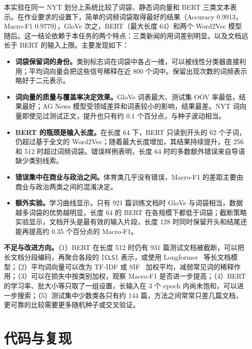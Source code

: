 \documentclass[lang=cn,a4paper]{elegantpaper}
\begin{document}
本实验在同一 NYT 划分上系统比较了词袋、静态词向量和 BERT 三类文本表示。在作业要求的设置下，简单的词频词袋取得最好的结果（Accuracy 0.9913，Macro-F1 0.9779），GloVe 次之，BERT（最大长度 64）和两个 Word2Vec 模型随后。这一结论依赖于本任务的两个特点：三类新闻的用词差别明显，以及文档远长于 BERT 的输入上限。主要发现如下：
\begin{itemize}
  \item \textbf{词袋保留词的身份。}类别标志词在词袋中各占一维，可以被线性分类器直接利用；平均词向量会把这些信号稀释在近 800 个词中。保留出现次数的词频表示略好于二元表示。
  \item \textbf{词向量的质量与覆盖率决定效果。}GloVe 词表最大、测试集 OOV 率最低，结果最好；AG News 模型受领域差异和词表较小的影响，结果最差。NYT 词向量即使见过测试正文，提升也只有约 0.1 个百分点，与种子波动相当。
  \item \textbf{BERT 的瓶颈是输入长度。}在长度 64 下，BERT 只读到开头的 62 个子词，仍超过基于全文的 Word2Vec；随着最大长度增加，其结果持续提升，在 256 和 512 时超过词频词袋。错误样例表明，长度 64 时的多数额外错误来自导语缺少类别线索。
  \item \textbf{错误集中在商业与政治之间。}体育类几乎没有错误，Macro-F1 的差距主要由商业与政治两类之间的混淆决定。
  \item \textbf{额外实验。}学习曲线显示，只有 921 篇训练文档时 GloVe 与词袋相当，数据越多词袋的优势越明显，长度 64 的 BERT 在各规模下都低于词袋；截断策略实验显示，文档开头是最有效的输入片段，长度 128 时同时保留开头和结尾还能再提高约 0.35 个百分点的 Macro-F1。
\end{itemize}

\textbf{不足与改进方向。}（1）BERT 在长度 512 时仍有 931 篇测试文档被截断，可以把长文档分段编码，再聚合各段的 \texttt{[CLS]} 表示，或使用 Longformer~\cite{beltagy2020longformer} 等长文档模型；（2）平均词向量可以改为 TF-IDF 或 SIF~\cite{arora2017simple} 加权平均，减弱常见词的稀释作用；（3）可以在损失中按类别加权，观察 Macro-F1 是否进一步提高；（4）BERT 的学习率、批大小等只取了一组设置，长输入在 3 个 epoch 内尚未饱和，可以进一步搜索；（5）测试集中少数类各只有约 144 篇，方法之间常常只差几篇文档，更可靠的比较需要更多随机种子或交叉验证。

\section*{代码与复现}
\end{document}
